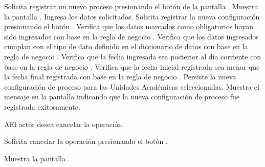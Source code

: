 
\begin{UCtrayectoria}
	\UCpaso [\UCactor] Solicita registrar un nuevo proceso presionando el botón  de la pantalla .
	\UCpaso Muestra la pantalla .
	\UCpaso [\UCactor] \label{IN-DAE-CU3.1:Ingresa} Ingresa los datos solicitados.
	\UCpaso  [\UCactor] \label{IN-DAE-CU3.1:Aceptar} Solicita registrar la nueva configuración presionando el botón .  
	\UCpaso Verifica que los datos marcados como obligatorios hayan sido ingresados con base en la regla de negocio . 
	\UCpaso Verifica que los datos ingresados cumplan con el tipo de dato definido en el diccionario de datos con base en la regla de negocio .  
	\UCpaso Verifica que la fecha ingresada sea posterior al día corriente con base en la regla de negocio .  
	\UCpaso Verifica que la fecha inicial registrada sea menor que la fecha final registrada con base en la regla de negocio . 
	\UCpaso Persiste la nueva configuración de proceso para las Unidades Académicas seleccionadas. 
	\UCpaso Muestra el mensaje  en la pantalla  indicando que la nueva configuración de proceso fue registrada exitosamente.
\end{UCtrayectoria}

\begin{UCtrayectoriaA}{A}{El actor desea cancelar la operación.}

	\UCpaso [\UCactor] Solicita cancelar la operación presionando el botón .

	\UCpaso Muestra la pantalla .

\end{UCtrayectoriaA}


